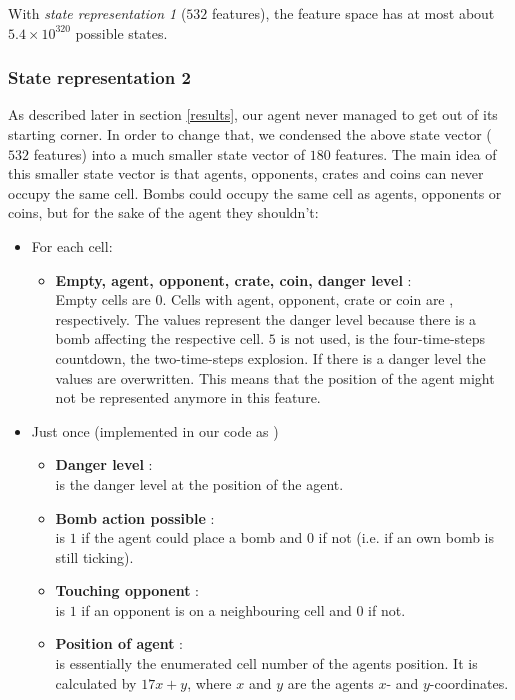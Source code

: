 	With \textit{state representation 1} ($532$ features), the feature space has at most about $5.4 \times 10^{320}$ possible states. 
	
	\subsubsection{State representation 2}
	As described later in section \ref{results}, our agent never managed to get out of its starting corner. In order to change that, we condensed the above state vector ($532$ features) into a much smaller state vector of $180$ features. The main idea of this smaller state vector is that agents, opponents, crates and coins can never occupy the same cell. Bombs could occupy the same cell as agents, opponents or coins, but for the sake of the agent they shouldn't:
	
	\begin{itemize}
		\item For each cell:
		\begin{itemize}
			\item \textbf{Empty, agent, opponent, crate, coin, danger level} :\\
			Empty cells are $0$. Cells with agent, opponent, crate or coin are , respectively. The values  represent the danger level because there is a bomb affecting the respective cell. $5$ is not used,  is the four-time-steps countdown,  the two-time-steps explosion. If there is a danger level the values  are overwritten. This means that the position of the agent might not be represented anymore in this feature.
		\end{itemize}
		\item Just once (implemented in our code as )
		\begin{itemize}
			\item \textbf{Danger level} :\\ 
			 is the danger level at the position of the agent.
			\item \textbf{Bomb action possible} : \\
			 is $1$ if the agent could place a bomb and $0$ if not (i.e. if an own bomb is still ticking).
			\item \textbf{Touching opponent} : \\
			 is $1$ if an opponent is on a neighbouring cell and $0$ if not.
			\item \textbf{Position of agent} : \\
			 is essentially the enumerated cell number of the agents position. It is calculated by $17x + y$, where $x$ and $y$ are the agents $x$- and $y$-coordinates. 
		\end{itemize} 
	\end{itemize}
	
